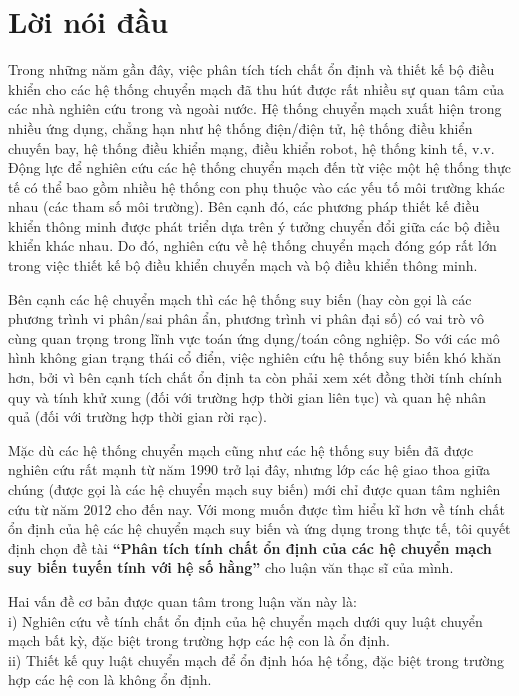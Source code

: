\documentclass[12pt,a4paper]{report}
\def\them{\addcontentsline}
\theoremstyle{definition}
\theoremstyle{definition}
\numberwithin{dl}{chapter}
\numberwithin{vd}{chapter}
\numberwithin{corollary}{chapter}
\numberwithin{lemma}{chapter}
\numberwithin{md}{chapter}
\numberwithin{dn}{chapter}
\numberwithin{cy}{chapter}
\numberwithin{nx}{chapter}
\def\them{\addcontentsline}
\begin{document}
\newpage

\chapter*{Lời nói đầu}\them{toc}{chapter}{Lời nói đầu}
Trong những năm gần đây, việc phân tích tích chất ổn định và thiết kế bộ điều khiển cho các hệ thống chuyển mạch đã thu hút được rất nhiều sự quan tâm của các nhà nghiên cứu trong và ngoài nước. 
Hệ thống chuyển mạch xuất hiện trong nhiều ứng dụng, chẳng hạn như hệ thống điện/điện tử, hệ thống điều khiển chuyến bay, hệ thống điều khiển mạng, điều khiển robot, hệ thống kinh tế, v.v. 
Động lực để nghiên cứu các hệ thống chuyển mạch đến từ việc một hệ thống thực tế có thể bao gồm nhiều hệ thống con phụ thuộc vào các yếu tố môi trường khác nhau (các tham số môi trường).
Bên cạnh đó, các phương pháp thiết kế điều khiển thông minh được phát triển dựa trên ý tưởng chuyển đổi giữa các bộ điều khiển khác nhau. 
Do đó, nghiên cứu về hệ thống chuyển mạch đóng góp rất lớn trong việc thiết kế bộ điều khiển chuyển mạch và bộ điều khiển thông minh.

Bên cạnh các hệ chuyển mạch thì các hệ thống suy biến (hay còn gọi là các phương trình vi phân/sai phân ẩn, phương trình vi phân đại số) có vai trò vô cùng quan trọng trong lĩnh vực toán ứng dụng/toán công nghiệp. So với các mô hình không gian trạng thái cổ điển, việc nghiên cứu hệ thống suy biến khó khăn hơn, bởi vì bên cạnh tích chất ổn định ta còn phải xem xét đồng thời tính chính quy và tính khử xung (đối với trường hợp thời gian liên tục) và quan hệ nhân quả (đối với trường hợp thời gian rời rạc). 

Mặc dù các hệ thống chuyển mạch cũng như các hệ thống suy biến đã được nghiên cứu rất mạnh từ năm 1990 trở lại đây, nhưng lớp các hệ giao thoa giữa chúng (được gọi là các hệ chuyển mạch suy biến) mới chỉ được quan tâm nghiên cứu từ năm 2012 cho đến nay. Với mong muốn được tìm hiểu kĩ hơn về tính chất ổn định của hệ các hệ chuyển mạch suy biến và ứng dụng trong thực tế, tôi quyết định chọn đề tài \textbf{``Phân tích tính chất ổn định của các hệ chuyển mạch suy biến tuyến tính với hệ số hằng''} cho luận văn thạc sĩ của mình. 

Hai vấn đề cơ bản được quan tâm trong luận văn này là:\\
i) Nghiên cứu về tính chất ổn định của hệ chuyển mạch dưới quy luật chuyển mạch bất kỳ, đặc biệt trong trường hợp các hệ con là ổn định. \\
ii) Thiết kế quy luật chuyển mạch để ổn định hóa hệ tổng, đặc biệt trong trường hợp các hệ con là không ổn định.
\end{document}

